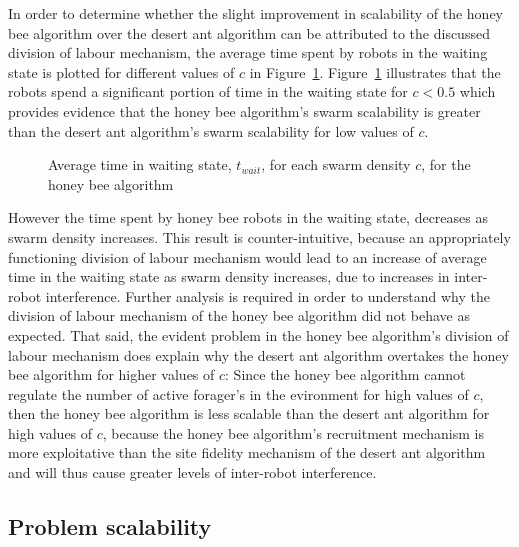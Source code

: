In order to determine whether the slight improvement in scalability of the honey bee algorithm over the desert ant algorithm can be attributed to the discussed division of labour mechanism, the average time spent by robots in the waiting state is plotted for different values of $c$ in Figure~\ref{fig:swarmscalabilitywaitingtime}. Figure~\ref{fig:swarmscalabilitywaitingtime} illustrates that the robots spend a significant portion of time in the waiting state for $c < 0.5$ which provides evidence that the honey bee algorithm's swarm scalability is greater than the desert ant algorithm's swarm scalability for low values of $c$.

\begin{figure}[!htb]
\centering
\small
\resizebox{\textwidth}{!}{}
\caption{Average time in waiting state, $t_{wait}$, for each swarm density $c$, for the honey bee algorithm}
\label{fig:swarmscalabilitywaitingtime}
\end{figure}

However the time spent by honey bee robots in the waiting state, decreases as swarm density increases. This result is counter-intuitive, because an appropriately functioning division of labour mechanism would lead to an increase of average time in the waiting state as swarm density increases, due to increases in inter-robot interference. Further analysis is required in order to understand why the division of labour mechanism of the honey bee algorithm did not behave as expected. That said, the evident problem in the honey bee algorithm's division of labour mechanism does explain why the desert ant algorithm overtakes the honey bee algorithm for higher values of $c$: Since the honey bee algorithm cannot regulate the number of active forager's in the evironment for high values of $c$, then the honey bee algorithm is less scalable than the desert ant algorithm for high values of $c$, because the honey bee algorithm's recruitment mechanism is more exploitative than the site fidelity mechanism of the desert ant algorithm and will thus cause greater levels of inter-robot interference. 

\subsection{Problem scalability}
\label{results:problemscalability}

